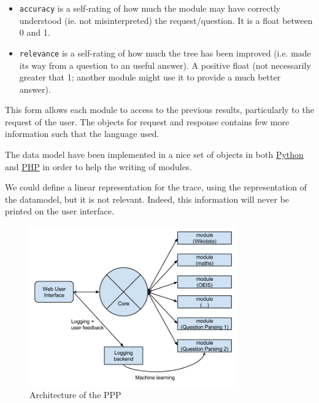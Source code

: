 \begin{itemize}
    \item \texttt{accuracy} is a self-rating of how much the module may have correctly understood (ie. not misinterpreted) the request/question. It is a float between 0 and 1.
    \item \texttt{relevance} is a self-rating of how much the tree has been improved (i.e. made its way from a question to an useful answer). A positive float (not necessarily greater that 1; another module might use it to provide a much better answer).
\end{itemize}

This form allows each module to access to the previous results, particularly to the request of the user. The objects for request and response contains few more information such that the language used.

The data model have been implemented in a nice set of objects in both \href{http://github.com/ProjetPP/PPP-datamodel-Python}{Python} and \href{http://github.com/ProjetPP/PPP-datamodel-PHP}{PHP} in order to help the writing of modules.

We could define a linear representation for the trace, using the representation of the datamodel, but it is not relevant. Indeed, this information will never be printed on the user interface.

\begin{figure}[!ht]
  \centering
    \label{struct}
    \caption{Architecture of the PPP}
    \includegraphics[width=0.8\textwidth]{../ppp_structure.png}
\end{figure}
